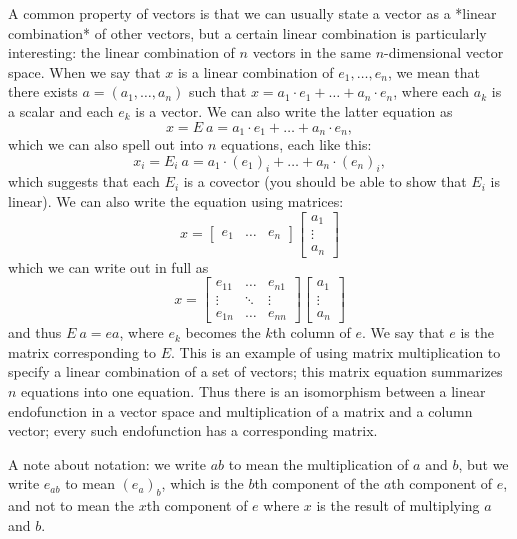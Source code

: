 A common property of vectors is that
we can usually state a vector as a *linear combination* of other vectors,
but a certain linear combination is particularly interesting:
the linear combination of $n$ vectors in the same $n$-dimensional vector space.
When we say that $x$ is a linear combination of $e_1,\ldots,e_n$,
we mean that there exists $a = (a_1,\ldots,a_n)$ such that $x = a_1 \cdot e_1 + \ldots + a_n \cdot e_n$,
where each $a_k$ is a scalar and each $e_k$ is a vector.
We can also write the latter equation as
\[
x = E~a = a_1 \cdot e_1 + \ldots + a_n \cdot e_n,
\]
which we can also spell out into $n$ equations, each like this:
\[
x_i = E_i~a = a_1 \cdot (e_1)_i + \ldots + a_n \cdot (e_n)_i,
\]
which suggests that each $E_i$ is a covector
(you should be able to show that $E_i$ is linear).
We can also write the equation using matrices:
\[
x =
\begin{bmatrix}
e_1 & \ldots & e_n
\end{bmatrix}
\begin{bmatrix}
a_1 \\ \vdots \\ a_n
\end{bmatrix}
\]
which we can write out in full as
\[
x =
\begin{bmatrix}
e_{11} & \ldots & e_{n1}
\\ \vdots & \ddots & \vdots
\\ e_{1n} & \ldots & e_{nn}
\end{bmatrix}
\begin{bmatrix}
a_1 \\ \vdots \\ a_n
\end{bmatrix}
\]
and thus $E~a = ea$,
where $e_k$ becomes the $k$th column of $e$.
We say that $e$ is the matrix corresponding to $E$.
This is an example of using matrix multiplication to specify
a linear combination of a set of vectors;
this matrix equation summarizes $n$ equations into one equation.
Thus there is an isomorphism between a linear endofunction in a vector space
and multiplication of a matrix and a column vector;
every such endofunction has a corresponding matrix.

A note about notation: we write $ab$ to mean the multiplication of $a$ and $b$,
but we write $e_{ab}$ to mean $(e_a)_b$, which is the $b$th component of the $a$th component of $e$,
and not to mean the $x$th component of $e$ where $x$ is the result of multiplying $a$ and $b$.

